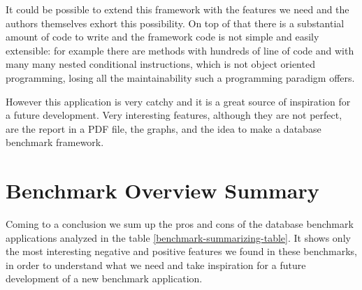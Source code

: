 It could be possible to extend this framework with the features we need and the authors themselves exhort this possibility. On top of that there is a substantial amount of code to write and the framework code is not simple and easily extensible: for example there are methods with hundreds of line of code and with many many nested conditional instructions, which is not object oriented programming, losing all the maintainability such a programming paradigm offers.

However this application is very catchy and it is a great source of inspiration for a future development. Very interesting features, although they are not perfect, are the report in a PDF file, the graphs, and the idea to make a database benchmark framework.
	
	\section{Benchmark Overview Summary}
Coming to a conclusion we sum up the pros and cons of the database benchmark applications analyzed in the table \ref{benchmark-summarizing-table}. It shows only the most interesting negative and positive features we found in these benchmarks, in order to understand what we need and take inspiration for a future development of a new benchmark application.

